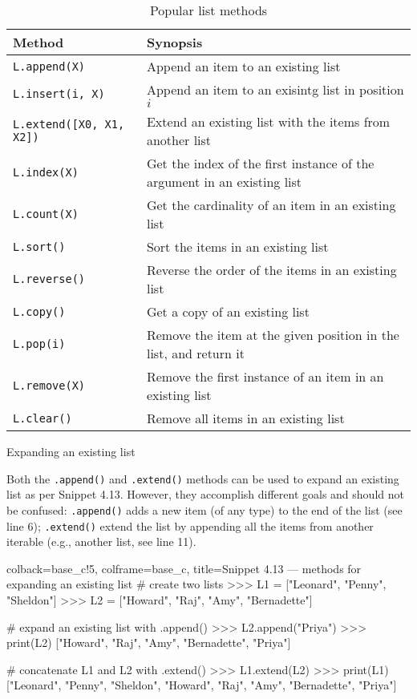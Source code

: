 \documentclass[a4paper,11pt]{book}
\numberwithin{figure}{chapter}
\numberwithin{table}{chapter}
\newcommand{\question}[1]{%
    \begin{tcolorbox}[colback=comp_c!10,colframe=comp_c,sidebyside align=top,width=\linewidth,before skip=1ex]
        #1
    \end{tcolorbox}
    \switchcolumn%
}
\newcommand{\note}[1]{%
    \begin{tcolorbox}[colback=white!0,colframe=white!10,width=\linewidth,before skip=1ex]
        #1
    \end{tcolorbox}
}
\begin{document}
\begin{table}[!htbp]
	\caption{Popular list methods}
	\label{tab:list_methods}
	\centering
	\begin{tabular}{ll}
		\toprule \toprule
		Method & Synopsis \\
		\midrule 
		\texttt{L.append(X)} & Append an item to an existing list\\
		\texttt{L.insert(i, X)} & Append an item to an exisintg list in position $i$ \\
		\texttt{L.extend([X0, X1, X2])} & Extend an existing list with the items from another list\\
		\texttt{L.index(X)} & Get the index of the first instance of the argument in an existing list\\
		\texttt{L.count(X)} & Get the cardinality of an item in an existing list\\
		\texttt{L.sort()} & Sort the items in an existing list\\
		\texttt{L.reverse()} & Reverse the order of the items in an existing list\\
		\texttt{L.copy()} & Get a copy of an existing list\\
		\texttt{L.pop(i)} & Remove the item at the given position in the list, and return it\\
		\texttt{L.remove(X)} & Remove the first instance of an item in an existing list\\
		\texttt{L.clear()} & Remove all items in an existing list\\
		\bottomrule 
	\end{tabular}
\end{table}

\begin{paracol}{2}
	\question{\raggedright Expanding an existing list}
	\note{Both the \texttt{.append()} and \texttt{.extend()} methods can be used to expand an existing list as per Snippet 4.13. However, they accomplish different goals and should not be confused: \texttt{.append()} adds a new item (of any type) to the end of the list (see line 6); \texttt{.extend()} extend the list by appending all the items from another iterable (e.g., another list, see line 11).}
\end{paracol}

\begin{pythoncode}[linenos=true,]{colback=base_c!5, colframe=base_c, title=\sffamily Snippet 4.13 --- methods for expanding an existing list}
# create two lists 
>>> L1 = ["Leonard", "Penny", "Sheldon"]
>>> L2 = ["Howard", "Raj", "Amy", "Bernadette"]

# expand an existing list with .append()
>>> L2.append("Priya") 
>>> print(L2)
["Howard", "Raj", "Amy", "Bernadette", "Priya"]

# concatenate L1 and L2 with .extend()
>>> L1.extend(L2)
>>> print(L1)
["Leonard", "Penny", "Sheldon", "Howard", "Raj", "Amy", "Bernadette", "Priya"]

\end{pythoncode}
\end{document}
